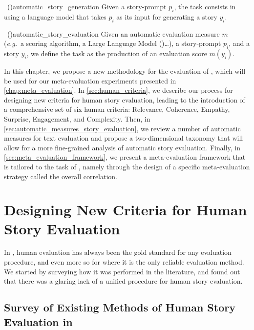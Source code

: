 \begin{defi}{\asgfull\ (\asg)}{automatic_story_generation}
    Given a story-prompt $p_i$, the {\asg} task consists in using a language model that takes $p_i$ as its input for generating a story $y_i$.
\end{defi}

\begin{defi}{\asefull\ (\ase)}{automatic_story_evaluation}
    Given an automatic evaluation measure $m$ (\textit{e.g.}\ a scoring algorithm, a Large Language Model (\llm)\dots), a story-prompt $p_i$, and a story $y_i$, we define the {\ase} task as the production of an evaluation score $m(y_i)$.
\end{defi}

In this chapter, we propose a new methodology for the evaluation of {\asg}, which will be used for our meta-evaluation experiments presented in \autoref{chap:meta_evaluation}. In \autoref{sec:human_criteria}, we describe our process for designing new criteria for human story evaluation, leading to the introduction of a comprehensive set of six human criteria: Relevance, Coherence, Empathy, Surprise, Engagement, and Complexity. Then, in \autoref{sec:automatic_measures_story_evaluation}, we review a number of automatic measures for text evaluation and propose a two-dimensional taxonomy that will allow for a more fine-grained analysis of automatic story evaluation. Finally, in \autoref{sec:meta_evaluation_framework}, we present a meta-evaluation framework that is tailored to the task of {\asg}, namely through the design of a specific meta-evaluation strategy called the overall correlation.

\section{Designing New Criteria for Human Story Evaluation}
\label{sec:human_criteria}

In {\nlpfull}, human evaluation has always been the gold standard for any evaluation procedure, and even more so for {\asg} where it is the only reliable evaluation method. We started by surveying how it was performed in the {\asg} literature, and found out that there was a glaring lack of a unified procedure for human story evaluation.

\subsection{Survey of Existing Methods of Human Story Evaluation in \asg}
\label{sub:existing_human_evaluation}

